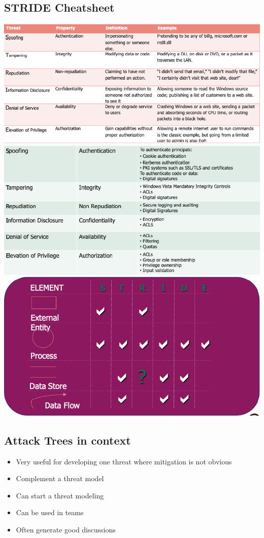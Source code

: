 \subsection{STRIDE Cheatsheet}
\includegraphics[width=1\linewidth]{../img/stride.png}
\includegraphics[width=1\linewidth]{../img/stride_mitigation.png}
\includegraphics[width=1\linewidth]{../img/stride_mapping.png}\\
\columnbreak

\subsection{Attack Trees in context}
\begin{itemize}
    \item Very useful for developing one threat where mitigation is not obvious
    \item Complement a threat model
    \item Can start a threat modeling
    \item Can be used in teams
    \item Often generate good discussions
\end{itemize}

